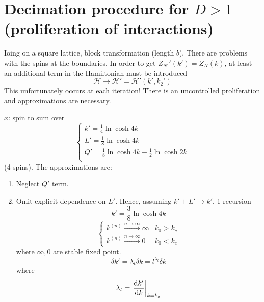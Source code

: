 \documentclass[../main/main.tex]{subfiles}
\begin{document}
\section{Decimation procedure for \( D>1 \) (proliferation of interactions)}
Ioing on a square lattice, block transformation (length \( b \)). There are problems with the spins at the boundaries.
In order to get \( Z_{N'}' (k') = Z_N (k) \), at least an additional term in the Hamiltonian must be introduced
\begin{equation}
  \mathcal{H} \rightarrow \mathcal{H}' = \mathcal{H}' (k',k_2')
\end{equation}
This unfortunately occurs at each iteration! There is an uncontrolled proliferation and approximations are necessary.
\begin{example}
  \( x \): spin to sum over
\begin{equation}
  \begin{cases}
   k' = \frac{1}{4} \ln{\cosh 4 k} \\
   L' = \frac{1}{8} \ln{\cosh 4 k} \\
   Q' = \frac{1}{8} \ln{\cosh 4 k} - \frac{1}{2} \ln{\cosh 2 k}\\
  \end{cases}
\end{equation}
(4 spins). The approximations are:
\begin{enumerate}
\item Neglect \( Q' \) term.
\item Omit explicit dependence on \( L' \). Hence, assuming \( k'+L' \rightarrow k' \). 1 recursion
\begin{equation}
  k' = \frac{3}{8} \ln{\cosh 4 k}
\end{equation}
\begin{equation}
  \begin{cases}
   k^{(n)} \overset{n \rightarrow \infty }{\longrightarrow} \infty  & k_0 > k_c \\
   k^{(n)} \overset{n \rightarrow \infty }{\longrightarrow} 0  & k_0 < k_c
  \end{cases}
\end{equation}
where \( \infty ,0 \) are stable fixed point.
\begin{equation}
  \delta k' = \lambda _t \delta k = l^{\lambda _t} \delta k
\end{equation}
where
\begin{equation}
  \lambda _t = \eval{\dv{k'}{k} }_{k=k_c}
\end{equation}

\end{enumerate}
\end{example}
\end{document}
